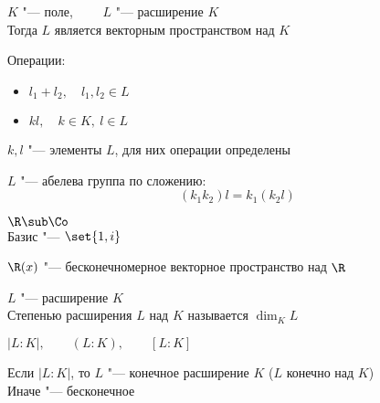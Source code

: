\begin{lemma}
	$ K $ "--- поле, $ \qquad L $ "--- расширение $ K $ \\
	Тогда $ L $ является векторным пространством над $ K $
\end{lemma}

\begin{iproof}
	\item Операции:
	\begin{itemize}
		\item $ l_1 + l_2, \quad l_1, l_2 \in L $
		\item $ kl, \quad k \in K, ~ l \in L $
	\end{itemize}
	$ k, l $ "--- элементы $ L $, для них операции определены
	\item $ L $ "--- абелева группа по сложению:
	$$ (k_1k_2)l = k_1(k_2l) $$
\end{iproof}

\begin{exmpls}
	\item $ \R \sub \Co $ \\
	Базис "--- $ \set{1, i} $
	\item $ \R(x) $ "--- бесконечномерное векторное пространство над $ \R $
\end{exmpls}

\begin{definition}
	$ L $ "--- расширение $ K $ \\
	Степенью расширения $ L $ над $ K $ называется $ \dim_K L $
\end{definition}

\begin{notation}
	$ |L : K|, \qquad (L : K), \qquad [L : K] $
\end{notation}

Если $ |L : K| $, то $ L $ "--- конечное расширение $ K $ ($ L $ конечно над $ K $) \\
Иначе "--- бесконечное

